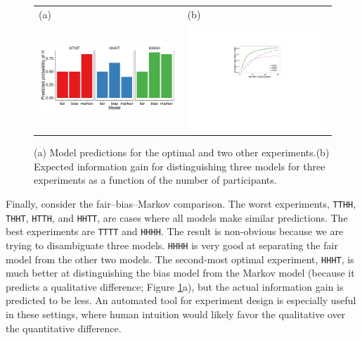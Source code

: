 \documentclass{article}
\begin{document}

\begin{figure}[t]
\centering
\begin{tabular}{l l}
(a) & (b)\\
\includegraphics[width=0.6\columnwidth]{img/coin_predictions.pdf} &
\includegraphics[width=0.4\columnwidth]{img/coin_eig_3way_nsubj_wlegend.pdf} \\\end{tabular}
\caption{(a) Model predictions for the optimal and two other experiments.(b) Expected information gain for distinguishing three models for three experiments as a function of the number of participants.}
\label{fig:coin_preds}
\end{figure}

Finally, consider the fair--bias--Markov comparison.
The worst experiments, \lstinline{TTHH}, \lstinline{THHT}, \lstinline{HTTH}, and \lstinline{HHTT}, are cases where all models make similar predictions.
The best experiments are \lstinline{TTTT} and \lstinline{HHHH}.
The result is non-obvious because we are trying to disambiguate three models.
\lstinline{HHHH} is very good at separating the fair model from the other two models.
The second-most optimal experiment, \lstinline{HHHT}, is much better at distinguishing the bias model from the Markov model (because it predicts a qualitative difference; Figure \ref{fig:coin_preds}a), but the actual information gain is predicted to be less.
An automated tool for experiment design is especially useful in these settings, where human intuition would likely favor the qualitative over the quantitative difference.
\end{document}
